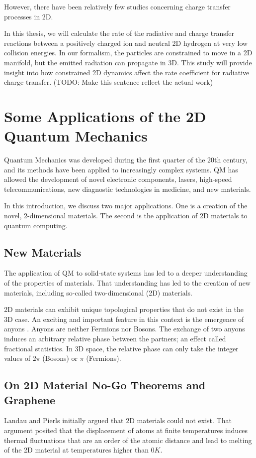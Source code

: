 However, there have been relatively few studies concerning charge transfer processes in 2D.

In this thesis, we will calculate the rate of the radiative and charge transfer reactions between a positively charged ion and neutral 2D hydrogen at very low collision energies. In our formalism, the particles are constrained to move in a 2D manifold, but the emitted radiation can propagate in 3D. This study will provide insight into how constrained 2D dynamics affect the rate coefficient for radiative charge transfer.
 (TODO: Make this sentence reflect the actual work)

\section{Some Applications of the 2D Quantum Mechanics}
Quantum Mechanics was developed during the first quarter of the 20th century, and its methods have been applied to increasingly complex systems. QM has allowed the development of novel electronic components, lasers, high-speed telecommunications, new diagnostic technologies in medicine, and new materials.

 In this introduction, we discuss two major applications.
 One is a creation of the novel, 2-dimensional materials.
 The second is the application of 2D materials to quantum computing.
 
 \subsection{New Materials}

The application of QM to solid-state systems has led to a deeper understanding of the properties of materials. That understanding has led to the creation of new materials, including so-called two-dimensional (2D) materials.
 
2D materials can exhibit unique topological properties that do not exist in the 3D case. An exciting and important feature in this context is the emergence of anyons \cite{anyonsR}. Anyons are neither Fermions nor Bosons. The exchange of two anyons induces an arbitrary relative phase between the partners; an effect called fractional statistics.
In 3D space, the relative phase can only take the integer values of $2 \pi $ (Bosons) or $ \pi$ (Fermions).
 
\subsection{On 2D Material No-Go Theorems and
Graphene}
Landau and Pierls\cite{LandauG}\cite{Pierls} initially argued that 2D materials could not exist. That argument posited that the displacement of atoms at finite temperatures induces thermal fluctuations that are an order of the atomic distance and lead to melting of the 2D material at temperatures higher than $ 0 K $. 


